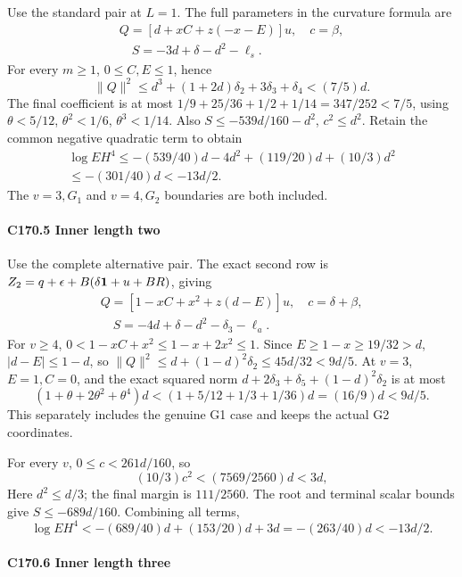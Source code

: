 Use the standard pair at \(L=1.\) The full parameters in the curvature formula are
\[
\begin{gathered}
Q=[d+xC+z(-x-E)]u,\quad c=\beta,\\
\quad S=-3d+\delta-d^2-\ell_s.
\end{gathered}\tag{C170.T178.12}
\]
For every \(m\ge1\), \(0\le C,\allowbreak \allowbreak  E\le1\), hence
\[
\|Q\|^2\le d^3+(1+2d)\delta_2+3\delta_3+\delta_4<(7/5)d.
\]
The final coefficient is at most \(1/9+25/36+1/2+1/14=347/252<7/5\), using \(\theta<5/12\), \(\theta^2<1/6\), \(\theta^3<1/14\). Also \(S\le-539d/160-d^2\), \(c^2\le d^2\). Retain the common negative quadratic term to obtain
\[
\begin{gathered}
\log EH^4\le-(539/40)d-4d^2+(119/20)d+(10/3)d^2\\
\le-(301/40)d<-13d/2.
\end{gathered}\tag{C170.T178.13}
\]
The \(v=3,\allowbreak \allowbreak  G_1\) and \(v=4,\allowbreak \allowbreak  G_2\) boundaries are both included.

\paragraph{C170.5 Inner length two}

Use the complete alternative pair. The exact second row is \(Z_2=q+\epsilon+B(\delta\mathbf1+u+BR)\), giving
\[
\begin{gathered}
Q=[1-xC+x^2+z(d-E)]u,\quad c=\delta+\beta,\\
\quad S=-4d+\delta-d^2-\delta_3-\ell_a.
\end{gathered}\tag{C170.T178.14}
\]
For \(v\ge4\), \(0<1-xC+x^2\le1-x+2x^2\le1\). Since \(E\ge1-x\ge19/32>d\), \(|d-E|\le1-d\), so \(\|Q\|^2\le d+(1-d)^2\delta_2\le45d/32<9d/5\). At \(v=3\), \(E=1,\allowbreak \allowbreak  C=0\), and the exact squared norm \(d+2\delta_3+\delta_5+(1-d)^2\delta_2\) is at most
\[
(1+\theta+2\theta^2+\theta^4)d<(1+5/12+1/3+1/36)d=(16/9)d<9d/5.
\]
This separately includes the genuine G1 case and keeps the actual G2 coordinates.

For every \(v\), \(0\le c<261d/160\), so
\[
(10/3)c^2<(7569/2560)d<3d,
\]
Here \(d^2\le d/3\); the final margin is \(111/2560\). The root and terminal scalar bounds give \(S\le-689d/160\). Combining all terms,
\[
\log EH^4<-(689/40)d+(153/20)d+3d
=-(263/40)d<-13d/2.
\tag{C170.T178.15}
\]

\paragraph{C170.6 Inner length three}

